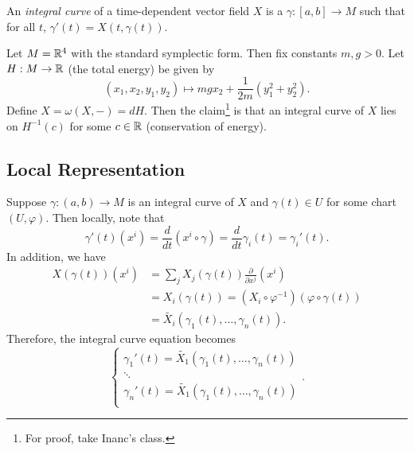 \documentclass[twoside, 10pt]{article}
\begin{document}
    \begin{defn} An \textit{integral curve} of a time-dependent vector field
    $X$ is a $\gamma:[a,b] \to M$ such that for all $t$, $\gamma'(t) =
X(t,\gamma(t))$.  \end{defn}

    \begin{exm} Let $M = \mathbb{R}^4$ with the standard symplectic form. Then fix
        constants $m,g > 0$. Let $H: M \to \mathbb{R}$ (the total energy) be given by
        \[(x_1, x_2, y_1,y_2) \mapsto mgx_2 + \frac{1}{2m} (y_1^2 + y_2^2).\]
        Define $X = \omega(X,-) = dH$. Then the claim\footnote{For proof, take
        Inanc's class.} is that an integral curve of $X$ lies on $H^{-1}(c)$
        for some $c \in \mathbb{R}$ (conservation of energy).  \end{exm}

    \subsection{Local Representation}%

    Suppose $\gamma: (a,b) \to M$ is an integral curve of $X$ and $\gamma(t)
    \in U$ for some chart $(U, \varphi)$. Then locally, note that \[
    \gamma'(t)(x^i) = \frac{d}{dt} (x^i \circ \gamma) = \frac{d}{dt}
\gamma_i(t) = \gamma_i'(t). \] In addition, we have \begin{align*}
X(\gamma(t))(x^i) &= \sum_j X_j(\gamma(t)) \frac{\partial}{\partial x^j} (x^i)
               \\ &= X_i(\gamma(t)) = (X_i \circ \varphi^{-1})(\varphi \circ
\gamma(t)) \\ &= \widetilde{X_i}(\gamma_1(t), \ldots, \gamma_n(t)).
\end{align*} Therefore, the integral curve equation becomes \begin{equation}
\begin{cases} \gamma_1'(t) = \widetilde{X_1}(\gamma_1(t), \ldots, \gamma_n(t))
    \\ \ddots \\ \gamma_n'(t) = \widetilde{X_1}(\gamma_1(t), \ldots,
    \gamma_n(t)) \\ \end{cases}.  \end{equation}
\end{document}
